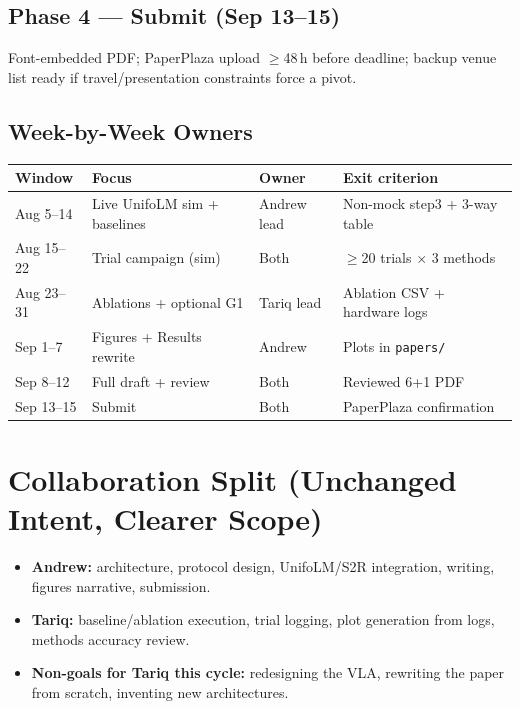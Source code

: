 \documentclass[conference]{IEEEtran}
\begin{document}
\subsection{Phase 4 --- Submit (Sep 13--15)}
Font-embedded PDF; PaperPlaza upload $\geq$48\,h before deadline; backup venue list ready if travel/presentation constraints force a pivot.

\subsection{Week-by-Week Owners}
{\scriptsize
\begin{tabularx}{\columnwidth}{@{}l X l p{}@{}}
\toprule
\textbf{Window} & \textbf{Focus} & \textbf{Owner} & \textbf{Exit criterion} \\
\midrule
Aug 5--14 & Live UnifoLM sim + baselines & Andrew lead & Non-mock step3 + 3-way table \\
Aug 15--22 & Trial campaign (sim) & Both & $\geq$20 trials $\times$ 3 methods \\
Aug 23--31 & Ablations + optional G1 & Tariq lead & Ablation CSV + hardware logs \\
Sep 1--7 & Figures + Results rewrite & Andrew & Plots in \texttt{papers/} \\
Sep 8--12 & Full draft + review & Both & Reviewed 6+1 PDF \\
Sep 13--15 & Submit & Both & PaperPlaza confirmation \\
\bottomrule
\end{tabularx}
}

\section{Collaboration Split (Unchanged Intent, Clearer Scope)}
\begin{itemize}
    \item \textbf{Andrew:} architecture, protocol design, UnifoLM/S2R integration, writing, figures narrative, submission.
    \item \textbf{Tariq:} baseline/ablation execution, trial logging, plot generation from logs, methods accuracy review.
    \item \textbf{Non-goals for Tariq this cycle:} redesigning the VLA, rewriting the paper from scratch, inventing new architectures.
\end{itemize}
\end{document}
